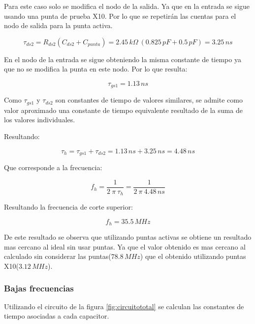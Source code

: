 \documentclass[10pt,spanish,a4paper,notitlepage]{article}
\begin{document}
Para este caso solo se modifica el nodo de la salida. Ya que en la
entrada se sigue usando una punta de prueba X10. Por lo que se
repetirán las cuentas para el nodo de salida para la punta activa.

\[ \displaystyle \tau_{ds2} = R_{ds2} (C_{ds2} + C_{punta}) = 
2.45\,\unit{k\Omega}\ (0.825\,\unit{pF} + 0.5\,\unit{pF}) =
3.25\,\unit{ns}\]

En el nodo de la entrada se sigue obteniendo la misma constante
de tiempo ya que no se modifica la punta en este nodo.
Por lo que resulta:

\[ \displaystyle \tau_{gs1} = 1.13\,\unit{ns}\]

Como $\tau_{gs1}$ y $\tau_{ds2}$ son constantes de tiempo de valores
similares, se admite como valor aproximado una constante
de tiempo equivalente resultado de la suma de los valores individuales.

Resultando:

\[ \displaystyle \tau_h = \tau_{gs1} + \tau_{ds2} = 1.13\,\unit{ns} + 3.25\,\unit{ns} = 4.48\,\unit{ns} \]

Que corresponde a la frecuencia:

\[ \displaystyle f_h = \frac{1}{2\ \pi\ \tau_h} = \frac{1}{2\ \pi\ 4.48\,\unit{ns}} \]

Resultando la frecuencia de corte superior:

\[ \displaystyle f_h = 35.5\,\unit{MHz} \]

De este resultado se observa que utilizando puntas activas se
obtiene un resultado mas cercano al ideal sin usar puntas. Ya
que el valor obtenido es mas cercano al calculado sin considerar
las puntas($78.8\,\unit{MHz}$) que el obtenido utilizando puntas
X10($3.12\,\unit{MHz}$).

\subsubsection{Bajas frecuencias}
Utilizando el circuito de la figura \ref{fig:circuitototal} se calculan las constantes de tiempo asociadas a cada capacitor.
\end{document}
